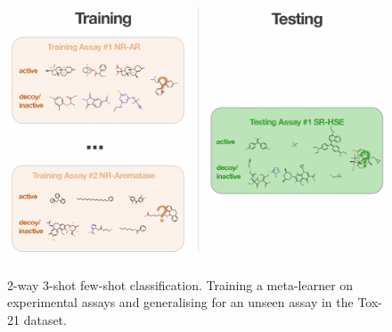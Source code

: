 \documentclass[journal=jcisd8,manuscript=article]{achemso} %
\begin{document}
\begin{figure}
    \centering
    \includegraphics[width=0.8\linewidth]{img/tox21-metalearning.png}
    \caption{2-way 3-shot few-shot classification. Training a meta-learner on experimental assays and generalising for an unseen assay in the Tox-21 dataset.}
    \label{fig:tox21metalearning}
\end{figure}
\end{document}

